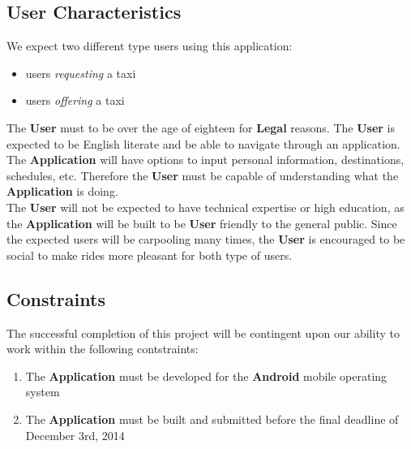 \documentclass[english]{article}
\begin{document}
\subsection{User Characteristics}
\label{sub:user_characteristics}
We expect two different type users using this application: 
\begin{itemize}
    \item users \textit{requesting} a taxi
    \item users \textit{offering} a taxi
\end{itemize}
The \textbf{User} must to be over the age of eighteen for \textbf{Legal} reasons. The \textbf{User} is expected to be English literate and be able to navigate through an application. The \textbf{Application} will have options to input personal information, destinations, schedules, etc. Therefore the \textbf{User} must be capable of understanding what the \textbf{Application} is doing.
\\
\bigskip
The \textbf{User} will not be expected to have technical expertise or high education, as the \textbf{Application} will be built to be \textbf{User} friendly to the general public. Since the expected users will be carpooling many times, the \textbf{User} is encouraged to be social to make rides more pleasant for both type of users. 

\subsection{Constraints}
\label{sub:constraints}
The successful completion of this project will be contingent upon our ability to work within the following contstraints:
\begin{enumerate}
	\item The \textbf{Application} must be developed for the  \textbf{Android} mobile operating system
	\item The \textbf{Application} must be built and submitted before the final deadline of December 3rd, 2014
\end{enumerate}
\end{document}
